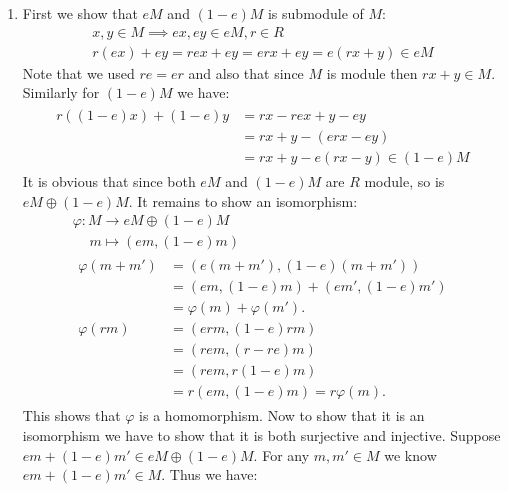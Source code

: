 \begin{enumerate}[label=]
    \item 
        First we show that $eM$ and $(1 - e)M$ is submodule of $M$:
        \begin{gather*}
            x, y \in M \implies ex, ey \in eM, r \in R \\
            r(ex) + ey = rex + ey = erx + ey = e(rx + y) \in eM
        \end{gather*}
        Note that we used $re = er$ and also that since $M$ is module then $rx + y \in M$. Similarly for $(1 - e)M$ we have:
        \begin{gather*}
            \begin{split}
                r((1-e)x) + (1-e)y & = rx - rex + y - ey \\
                & = rx + y - (erx - ey) \\
                &= rx + y - e(rx - y) \in (1 - e)M
            \end{split}
        \end{gather*}
        It is obvious that since both $eM$ and $(1 - e)M$ are $R$ module, so is $eM \oplus (1 - e)M$. It remains to show an isomorphism:
        \begin{gather*}
            \varphi: M \to eM \oplus (1 - e)M \\
            \phantom{llll}m \mapsto (em, (1-e)m) \\
            \begin{split}
                \varphi(m + m') & = (e(m + m'),(1 - e) (m + m')) \\
                & = (em , (1 - e)m) + (em', (1 - e)m') \\
                & = \varphi(m) + \varphi(m'). \\
                \varphi(rm) & = (erm, (1 - e)rm) \\ 
                & = (rem, (r - re)m) \\
                & = (rem, r(1 - e)m) \\
                & = r(em, (1 - e)m) = r \varphi(m).
            \end{split}
        \end{gather*}
        This shows that $\varphi$ is a homomorphism. Now to show that it is an isomorphism we have to show that it is both surjective and injective.
        Suppose $em + (1 - e)m' \in eM \oplus (1 - e)M$.
        For any $m, m' \in M$ we know $em + (1 - e)m' \in M$. Thus we have:
        \begin{gather*}

\end{gather*}
\end{enumerate}
